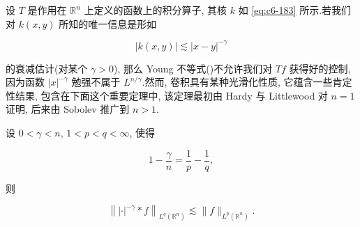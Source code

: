 
设 $T$ 是作用在 $\mathbb{R}^n$ 上定义的函数上的积分算子, 其核 $k$ 如 \eqref{eq:c6-183} 所示.若我们对 $k(x, y)$ 所知的唯一信息是形如

\[
|k(x, y)| \lesssim |x-y|^{-\gamma}
\]

的衰减估计(对某个 $\gamma>0$), 那么 Young 不等式()不允许我们对 $Tf$ 获得好的控制, 因为函数 $|x|^{-\gamma}$ 勉强不属于 $L^{n/\gamma}$.然而, 卷积具有某种光滑化性质, 它蕴含一些肯定性结果, 包含在下面这个重要定理中, 该定理最初由 Hardy 与 Littlewood 对 $n=1$ 证明, 后来由 Sobolev 推广到 $n>1$.

\begin{theorem}\label{thm:c6-2.9}
设 $0<\gamma<n$, $1<p<q<\infty$, 使得

\begin{equation}
1 - \frac{\gamma}{n} = \frac{1}{p} - \frac{1}{q}, \label{eq:c6-196}
\end{equation}

则

\begin{equation}
\left\||\cdot|^{-\gamma}*f\right\|_{L^q(\mathbb{R}^n)} \lesssim \|f\|_{L^p(\mathbb{R}^n)}.\label{eq:c6-197}
\end{equation}
\end{theorem}

